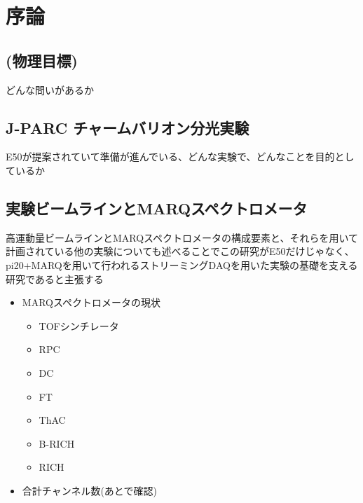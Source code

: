 \documentclass[../main.tex]{subfiles}
\begin{document}
\section{序論}
\label{sec:introduction}
\subsection{(物理目標)}
どんな問いがあるか
\subsection{J-PARC チャームバリオン分光実験}
E50が提案されていて準備が進んでいる、どんな実験で、どんなことを目的としているか
\subsection{実験ビームラインとMARQスペクトロメータ}
高運動量ビームラインとMARQスペクトロメータの構成要素と、それらを用いて計画されている他の実験についても述べることでこの研究がE50だけじゃなく、pi20+MARQを用いて行われるストリーミングDAQを用いた実験の基礎を支える研究であると主張する
\begin{tcolorbox}[
  title=執筆メモ,
  colback=yellow!8,
  colframe=black!30,
  breakable
]
\begin{itemize}
  \item MARQスペクトロメータの現状
  \begin{itemize}
    \item TOFシンチレータ
    \item RPC
    \item DC
    \item FT
    \item ThAC
    \item B-RICH
    \item RICH
  \end{itemize}
  \item 合計チャンネル数(あとで確認)
\end{itemize}
\end{tcolorbox}
\end{document}
